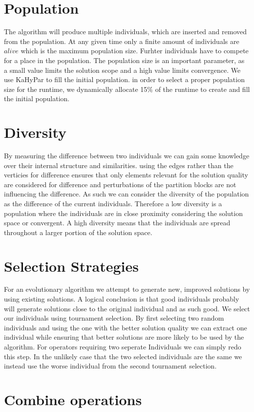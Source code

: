 \documentclass[a4paper,12pt,bibtotoc,titlepage, liststotoc,BCOR7mm,headsepline,pointlessnumbers]{scrbook}
\numberwithin{equation}{section}
\begin{document}
\section{Population}
The algorithm will produce multiple individuals, which are inserted and removed from the population. At any given time only a finite amount of
individuals are $alive$ which is the maximum population size. Furhter individuals have to compete for a place in the population. 
The population size is an important parameter, as a small value limits the solution scope and a high value limits convergence.
We use KaHyPar to fill the initial population.
in order to select a proper population size for the runtime, we dynamically allocate 15\% of the runtime to create and fill the initial population.
\section{Diversity}
By measuring the difference between two individuals we can gain some knowledge over their internal structure and similarities.
using the edges rather than the verticies for difference ensures that only elements relevant for the solution quality are considered
for difference and perturbations of the partition blocks are not influencing the difference. As such we can consider the diversity of
the population as the difference of the current individuals. Therefore a low diversity is a population where the individuals are 
in close proximity considering the solution space or convergent. A high diversity means that the individuals are spread throughout a 
larger portion of the solution space.  
\section{Selection Strategies}
For an evolutionary algorithm we attempt to generate new, improved solutions by using existing solutions. A logical conclusion is that good individuals probably will generate solutions
close to the original individual and as such good. We select our individuals using tournament selection. By first selecting two random individuals and using the one with the better solution quality we can extract one individual while ensuring that better solutions are more likely to be used by the algorithm. For operators requiring two seperate Individuals we can simply redo this step. In the unlikely case that the two selected individuals are the same we instead use the worse individual from the second tournament selection. 
\section{Combine operations}
\end{document}
